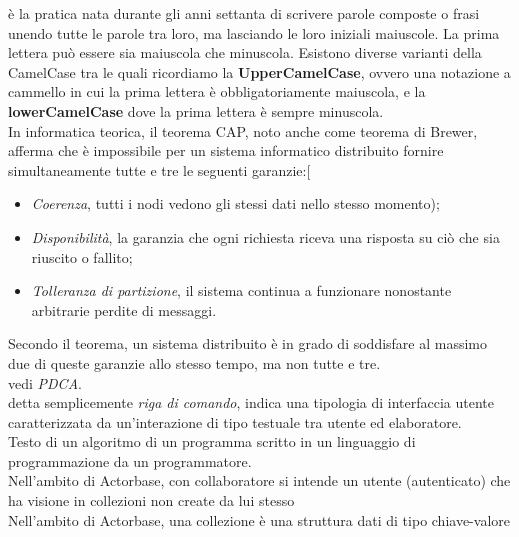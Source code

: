 \documentclass{scalatekids-article}
\begin{document}

 è la pratica nata durante gli anni settanta di scrivere parole composte o frasi unendo tutte le parole tra loro, ma lasciando le loro iniziali maiuscole. La prima lettera può essere sia maiuscola che minuscola.
Esistono diverse varianti della CamelCase tra le quali ricordiamo la \textbf{UpperCamelCase}, ovvero una notazione a cammello in cui la prima lettera è obbligatoriamente maiuscola, e la \textbf{lowerCamelCase} dove la prima lettera è sempre minuscola.
\\

 In informatica teorica, il teorema CAP, noto anche come teorema di Brewer, afferma che è impossibile per un sistema informatico distribuito fornire simultaneamente tutte e tre le seguenti garanzie:[
\begin{itemize}
	\item \textit{Coerenza}, tutti i nodi vedono gli stessi dati nello stesso momento);
	\item \textit{Disponibilità}, la garanzia che ogni richiesta riceva una risposta su ciò che sia riuscito o fallito;
	\item \textit{Tolleranza di partizione}, il sistema continua a funzionare nonostante arbitrarie perdite di messaggi.
\end{itemize}
Secondo il teorema, un sistema distribuito è in grado di soddisfare al massimo due di queste garanzie allo stesso tempo, ma non tutte e tre.
\\

 vedi \textit{PDCA}.
\\

 detta semplicemente \textit{riga di comando}, indica una tipologia di interfaccia utente caratterizzata da un'interazione di tipo testuale tra utente ed elaboratore.
\\

 Testo di un algoritmo di un programma scritto in un linguaggio di programmazione da un programmatore.
\\

 Nell'ambito di Actorbase, con collaboratore si intende un utente (autenticato) che ha visione in collezioni non create da lui stesso
\\

 Nell'ambito di Actorbase, una collezione è una struttura dati di tipo chiave-valore
\\
\end{document}
